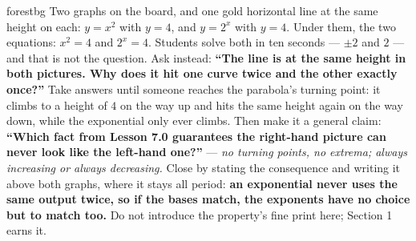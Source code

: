 \documentclass[10pt]{article}
\begin{document}
\begin{skillbox}[Hook]{forestbg}
    Two graphs on the board, and one gold horizontal line at the same height on each: $y=x^{2}$ with
    $y=4$, and $y=2^{x}$ with $y=4$. Under them, the two equations: \textbf{$x^{2}=4$} and
    \textbf{$2^{x}=4$}. Students solve both in ten seconds --- $\pm2$ and $2$ --- and that is not the
    question. Ask instead: \textbf{``The line is at the same height in both pictures. Why does it hit
    one curve twice and the other exactly once?''} Take answers until someone reaches the parabola's
    turning point: it climbs to a height of $4$ on the way up and hits the same height again on the way
    down, while the exponential only ever climbs. Then make it a general claim: \textbf{``Which fact
    from Lesson 7.0 guarantees the right-hand picture can never look like the left-hand one?''} ---
    \emph{no turning points, no extrema; always increasing or always decreasing.} Close by stating the
    consequence and writing it above both graphs, where it stays all period: \textbf{an exponential
    never uses the same output twice, so if the bases match, the exponents have no choice but to match
    too.} Do not introduce the property's fine print here; Section 1 earns it.
\end{skillbox}
\end{document}
